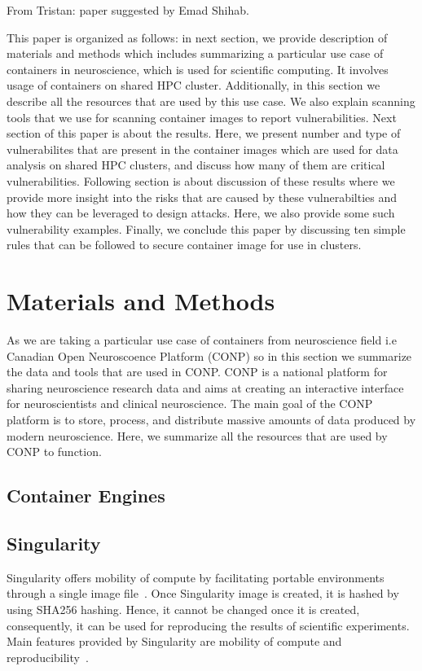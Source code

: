 \documentclass[a4paper,num-refs]{oup-contemporary}
\newcommand{\TG}[1]{\color{blue}From Tristan: #1\color{black}}
\begin{document}
\TG{paper suggested by Emad Shihab.}

This paper is organized as follows: in next section, we provide description
of materials and methods which includes summarizing a particular use case of
containers in neuroscience, which is used for scientific computing. It involves
usage of containers on shared HPC cluster. Additionally, in this section we
describe all the resources that are used by this use case. We also explain
scanning tools that we use for scanning container images to report
vulnerabilities. Next section of this paper is about the results. Here, we
present number and type of vulnerabilites that are present in the container images
which are used for data analysis on shared HPC clusters, and discuss how many of them are
critical vulnerabilities. Following section is about discussion of these results
where we provide more insight into the risks that are caused by these vulnerabilties
and how they can be leveraged to design attacks. Here, we also provide some such
vulnerability examples. Finally, we conclude this paper by discussing ten simple
rules that can be followed to secure container image for use in clusters.

\section{Materials and Methods}

As we are taking a particular use case of containers from
neuroscience field i.e Canadian Open Neuroscoence Platform (CONP) so  
in this section we summarize the data and tools 
that are used in CONP. CONP is a national platform for sharing neuroscience
research data and aims at creating an interactive interface for neuroscientists and
clinical neuroscience. The main goal of the CONP platform is to store, process, and
distribute massive amounts of data produced by modern neuroscience.
Here, we summarize all the resources that are
used by CONP to function.


\subsection{Container Engines}

\subsection{Singularity}

Singularity offers mobility of compute by facilitating portable environments 
through a single image file~\cite{kurtzer2016singularity}. Once Singularity image
is created, it is hashed by using SHA256 hashing. Hence, it cannot be changed
once it is created, consequently, it can be used for reproducing the results of
scientific experiments. Main features provided by
Singularity are mobility of compute and reproducibility~\cite{kurtzer2017singularity}.
\end{document}
